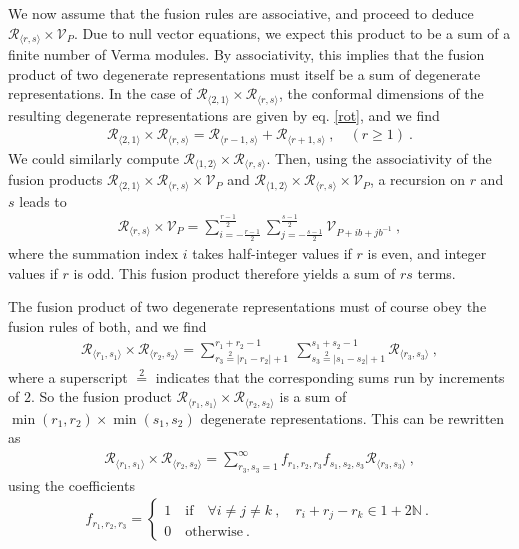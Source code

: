 \documentclass[12pt, a4paper, notitlepage, twoside]{report}
\numberwithin{equation}{section}
\theoremstyle{break}
\begin{document}
We now assume that the fusion rules are associative, and proceed to deduce $\mathcal{R}_{\langle r,s \rangle}\times \mathcal{V}_P$.
Due to null vector equations, we expect this product to be a sum of a finite number of Verma modules.
By associativity, this implies that the fusion product of two degenerate representations must itself be a sum of degenerate representations.
In the case of  
$\mathcal{R}_{\langle 2,1\rangle}\times \mathcal{R}_{\langle r,s\rangle}$, the conformal dimensions of the resulting degenerate representations are given by eq. \eqref{rot}, and we find
\begin{align}
\mathcal{R}_{\langle 2,1\rangle}\times \mathcal{R}_{\langle r,s\rangle} = \mathcal{R}_{\langle r-1,s\rangle} + \mathcal{R}_{\langle r+1,s\rangle }\ , \quad (r\geq 1)\ .
\label{rtod}
\end{align}
We could similarly compute $\mathcal{R}_{\langle 1,2\rangle}\times \mathcal{R}_{\langle r,s\rangle}$.
Then, using the associativity of the fusion products $\mathcal{R}_{\langle 2,1\rangle}\times \mathcal{R}_{\langle r,s\rangle}\times \mathcal{V}_P$ and $\mathcal{R}_{\langle 1,2\rangle}\times \mathcal{R}_{\langle r,s\rangle}\times \mathcal{V}_P$, a recursion on $r$ and $s$ leads to
\begin{align}
 \boxed{\mathcal{R}_{\langle r,s \rangle}\times \mathcal{V}_P = \sum_{i=-\frac{r-1}{2}}^{\frac{r-1}{2}} \sum_{j=-\frac{s-1}{2}}^{\frac{s-1}{2}} \mathcal{V}_{P + ib+jb^{-1}}}
 \ ,
\label{rtv}
\end{align}
where the summation index $i$ takes half-integer values if $r$ is even, and integer values if $r$ is odd. 
This fusion product therefore yields a sum of 
$rs$ terms.

The fusion product of two degenerate representations must of course obey the fusion rules of both, and we find
\begin{align}
 \boxed{\mathcal{R}_{\langle r_1,s_1 \rangle} \times \mathcal{R}_{\langle r_2,s_2 \rangle} = \sum_{r_3\overset{2}{=}|r_1-r_2|+1}^{r_1+r_2-1}\ \sum_{s_3\overset{2}{=}|s_1-s_2|+1}^{s_1+s_2-1} \mathcal{R}_{\langle r_3,s_3 \rangle}}\ ,
\label{rrsr}
\end{align}
where a superscript $\overset{2}{=}$ indicates that the corresponding sums run by increments of $2$.
So the fusion product $\mathcal{R}_{\langle r_1,s_1 \rangle} \times \mathcal{R}_{\langle r_2,s_2 \rangle}$ is a sum of $\min(r_1,r_2)\times \min(s_1,s_2)$ degenerate representations.
This can be rewritten as 
\begin{align}
\mathcal{R}_{\langle r_1,s_1 \rangle} \times \mathcal{R}_{\langle r_2,s_2 \rangle} = \sum_{r_3,s_3=1}^\infty f_{r_1,r_2,r_3} f_{s_1,s_2,s_3} \mathcal{R}_{\langle r_3,s_3 \rangle}\ ,
 \label{rrrsss}
\end{align}
using the coefficients
\begin{align}
f_{r_1,r_2,r_3} = \left\{\begin{array}{l}  1 \quad \text{if} \quad 
 \forall i\neq j\neq k \ , \quad r_i+r_j-r_k \in 1 + 2{\mathbb{N}}\ .
\\ 0 \quad \text{otherwise} \ .\end{array}\right.  
\label{frrr}
\end{align}
\end{document}
